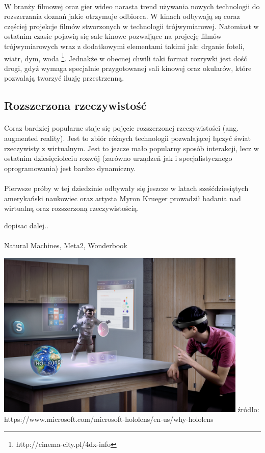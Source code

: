 \documentclass[12pt]{article}
\begin{document}
{{\paragraph{}
W branży filmowej oraz gier wideo narasta trend używania nowych technologii do rozszerzania doznań jakie otrzymuje odbiorca.
W kinach odbywają są coraz częściej projekcje filmów stworzonych w technologii trójwymiarowej. Natomiast w ostatnim czasie pojawią się sale kinowe pozwaljące  na projecję filmów trójwymiarowych wraz z dodatkowymi elementami takimi jak: drganie foteli, wiatr, dym, woda \footnote{http://cinema-city.pl/4dx-info}. Jednakże w obecnej chwili taki format rozrywki jest dość drogi, gdyż wymaga specjalnie przygotowanej sali kinowej oraz okularów, które pozwalają tworzyć iluzję przestrzenną. 

\subsection{Rozszerzona rzeczywistość}
\paragraph{}
Coraz bardziej popularne staje się pojęcie rozszerzonej rzeczywistości (ang. augmented reality). Jest to zbiór różnych technologii pozwalającej łączyć świat rzeczywisty z wirtualnym. Jest to jezcze mało popularny sposób interakcji, lecz w ostatnim dziesięcioleciu rozwój (zarówno urządzeń jak i specjalistycznego oprogramowania) jest bardzo dynamiczny.
\paragraph{}
Pierwsze próby w tej dziedzinie odbywały się jeszcze w latach sześćdziesiątych amerykański naukowiec oraz artysta Myron Krueger  prowadził badania nad wirtualną oraz rozszerzoną rzeczywistością.

dopisac dalej..

\paragraph{}
Natural Machines, Meta2, Wonderbook
\begin{center}
\includegraphics[width=0.9\textwidth]{images/hololens.png}
\small {źródło: https://www.microsoft.com/microsoft-hololens/en-us/why-hololens }
\end{center}


}}
\end{document}
